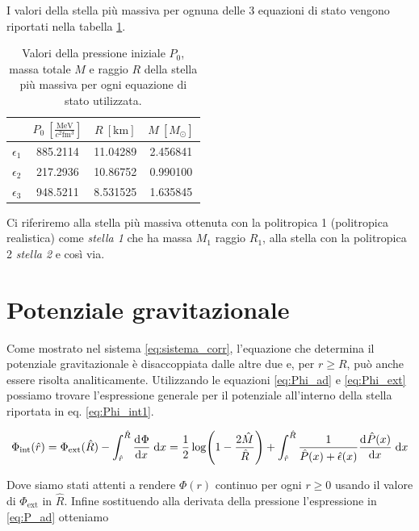 \documentclass[a4paper, titlepage]{article}
\newcommand{\Punit}[0]{\frac{\unit{\mega\electronvolt}}{c^2 \unit{\femto\cubic\meter}}}
\begin{document}
I valori della stella più massiva per ognuna delle 3 equazioni di stato vengono
riportati nella tabella \ref{tab:Mgrosso}.

\begin{table}[h!]
    \centering
    \begin{tabular}{c|c|c|c}
        & $P_0~\left[\Punit\right]$ & $R~[\unit{\kilo\meter}]$ & $M~[M_\odot]$ \\
         \hline
         $\epsilon_1$ & 885.2114 & 11.04289 & 2.456841 \\
         \hline
         $\epsilon_2$ & 217.2936 & 10.86752 & 0.990100 \\
         \hline
         $\epsilon_3$ & 948.5211 & 8.531525 & 1.635845 \\
    \end{tabular}
    \caption{Valori della pressione iniziale $P_0$, massa totale $M$ e raggio
    $R$ della stella più massiva per ogni equazione di stato utilizzata.}
    \label{tab:Mgrosso}
\end{table}

Ci riferiremo alla stella più massiva ottenuta con la politropica 1 (politropica
realistica) come \textit{stella 1} che ha massa $M_1$ raggio $R_1$, alla stella
con la politropica 2 \textit{stella 2} e così via.


\section{Potenziale gravitazionale}

Come mostrato nel sistema \ref{eq:sistema_corr}, l'equazione che determina il
potenziale gravitazionale è disaccoppiata dalle altre due e, per $r \geq R$,
può anche essere risolta analiticamente.
Utilizzando le equazioni \ref{eq:Phi_ad} e \ref{eq:Phi_ext} possiamo trovare
l'espressione generale per il potenziale all'interno della stella riportata in
eq. \ref{eq:Phi_int1}.

\begin{equation}
    \Phi_\text{int} (\hat r) =
    \Phi_\text{ext} (\hat R) - \int_{\hat r}^{\hat R} \dv[]{\Phi}{x}
    \;\mathrm{d}x =
    \frac{1}{2} \log(1 - \frac{2 \hat M}{\hat R})
    + \int_{\hat r}^{\hat R} \frac{1}{\hat P (x) + \hat \epsilon (x)}
    \dv[]{\hat P (x)}{x} \;\mathrm{d}x
    \label{eq:Phi_int1}
\end{equation}

Dove siamo stati attenti a rendere $\Phi (r)$ continuo per ogni $r \geq 0$
usando il valore di $\Phi_\text{ext}$ in $\hat R$. Infine sostituendo alla
derivata della pressione l'espressione in \ref{eq:P_ad} otteniamo
\end{document}
